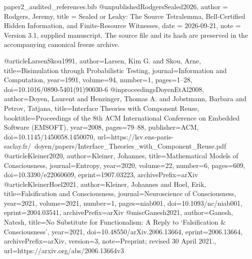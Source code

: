 \begin{filecontents*}[overwrite]{paper2_audited_references.bib}
@unpublished{RodgersSealed2026,
 author = {Rodgers, Jeremy},
 title = {Sealed or Leaky: The Source Tetralemma, Bell-Certified Hidden Information, and Finite-Resource Witnesses},
 date = {2026-09-21},
 note = {Version 3.1, supplied manuscript. The source file and its hash are preserved in the accompanying canonical freeze archive.}
}


@article{LarsenSkou1991,
 author={Larsen, Kim G. and Skou, Arne},
 title={Bisimulation through Probabilistic Testing},
 journal={Information and Computation},
 year={1991}, volume={94}, number={1}, pages={1--28},
 doi={10.1016/0890-5401(91)90030-6}
}
@inproceedings{DoyenEtAl2008,
 author={Doyen, Laurent and Henzinger, Thomas A. and Jobstmann, Barbara and Petrov, Tatjana},
 title={Interface Theories with Component Reuse},
 booktitle={Proceedings of the 8th ACM International Conference on Embedded Software (EMSOFT)},
 year={2008}, pages={79--88}, publisher={ACM}, doi={10.1145/1450058.1450070},
 url={https://lsv.ens-paris-saclay.fr/~doyen/papers/Interface_Theories_with_Component_Reuse.pdf}
}
@article{Kleiner2020,
 author={Kleiner, Johannes}, title={Mathematical Models of Consciousness},
 journal={Entropy}, year={2020}, volume={22}, number={6}, pages={609},
 doi={10.3390/e22060609}, eprint={1907.03223}, archivePrefix={arXiv}
}
@article{KleinerHoel2021,
 author={Kleiner, Johannes and Hoel, Erik}, title={Falsification and Consciousness},
 journal={Neuroscience of Consciousness}, year={2021}, volume={2021}, number={1}, pages={niab001},
 doi={10.1093/nc/niab001}, eprint={2004.03541}, archivePrefix={arXiv}
}
@misc{Ganesh2021,
 author={Ganesh, Natesh},
 title={No Substitute for Functionalism: A Reply to `Falsification \& Consciousness'},
 year={2021}, doi={10.48550/arXiv.2006.13664}, eprint={2006.13664}, archivePrefix={arXiv}, version={3},
 note={Preprint; revised 30 April 2021.}, url={https://arxiv.org/abs/2006.13664v3}
}
\end{filecontents*}
\documentclass[11pt,a4paper]{article}
\usepackage[T1]{fontenc}
\usepackage[utf8]{inputenc}
\usepackage[margin=25mm,headheight=14pt]{geometry}
\usepackage{amsmath,amsthm,mathtools}
\usepackage{newtxtext,newtxmath}
\usepackage{microtype,booktabs,tabularx,array,longtable}
\usepackage{graphicx,xcolor,tikz,pgfplots}
\usetikzlibrary{arrows.meta,positioning,calc}
\pgfplotsset{compat=1.18}
\usepackage{enumitem}
\usepackage{csquotes}
\usepackage[backend=biber,style=numeric,sorting=nyt,maxbibnames=7,giveninits=true,doi=true,url=false,isbn=false,eprint=true]{biblatex}

\usepackage{fancyhdr,aliascnt}
